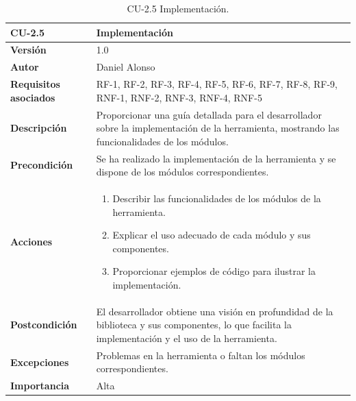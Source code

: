 \begin{table}[p]
	\centering
	\begin{tabularx}{\linewidth}{ p{} p{} }
		\toprule
		\textbf{CU-2.5}               & \textbf{Implementación}                                                                                                                              \\
		\toprule
		\textbf{Versión}              & 1.0                                                                                                                                                  \\
		\textbf{Autor}                & Daniel Alonso                                                                                                                                        \\
		\textbf{Requisitos asociados} & RF-1, RF-2, RF-3, RF-4, RF-5, RF-6, RF-7, RF-8, RF-9, RNF-1, RNF-2, RNF-3, RNF-4, RNF-5                                                              \\
		\textbf{Descripción}          & Proporcionar una guía detallada para el desarrollador sobre la implementación de la herramienta, mostrando las funcionalidades de los módulos.       \\
		\textbf{Precondición}         & Se ha realizado la implementación de la herramienta y se dispone de los módulos correspondientes.                                                    \\
		\textbf{Acciones}             & \begin{enumerate}
			                                \item Describir las funcionalidades de los módulos de la herramienta.
			                                \item Explicar el uso adecuado de cada módulo y sus componentes.
			                                \item Proporcionar ejemplos de código para ilustrar la implementación.
		                                \end{enumerate}                                                                                \\
		\textbf{Postcondición}        & El desarrollador obtiene una visión en profundidad de la biblioteca y sus componentes, lo que facilita la implementación y el uso de la herramienta. \\
		\textbf{Excepciones}          & Problemas en la herramienta o faltan los módulos correspondientes.                                                                                   \\
		\textbf{Importancia}          & Alta                                                                                                                                                 \\
		\bottomrule
	\end{tabularx}
	\caption{CU-2.5 Implementación.}
	\label{tab:cu2.5}
\end{table}

